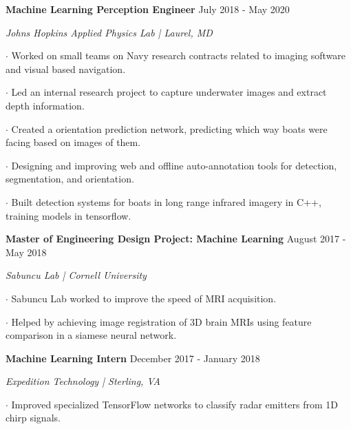 \documentclass[11pt]{article} %
\begin{document}
    \vspace{+4ex}
    \textbf{\large Machine Learning Perception Engineer} \hfill July 2018 - May 2020 \vspace{-0ex}
	\setlength{\parindent}{-0ex} \par
		\textit{Johns Hopkins Applied Physics Lab | Laurel, MD} \vspace{+3ex} \par
		$\boldsymbol{\cdot}$ Worked on small teams on Navy research contracts related to imaging software and visual based navigation. \par \vspace{+1ex}
		$\boldsymbol{\cdot}$ Led an internal research project to capture underwater images and extract depth information. \par \vspace{+1ex}
		$\boldsymbol{\cdot}$ Created a orientation prediction network, predicting which way boats were facing based on images of them. \par \vspace{+1ex}
		$\boldsymbol{\cdot}$ Designing and improving web and offline auto-annotation tools for detection, segmentation, and orientation.\par \vspace{+1ex}
		$\boldsymbol{\cdot}$ Built detection systems for boats in long range infrared imagery in C++, training models in tensorflow. \par \vspace{+1ex}
    \vspace{+3ex}
    \textbf{\large Master of Engineering Design Project: Machine Learning} \hfill August 2017 - May 2018 \vspace{-0ex}
	\setlength{\parindent}{-0ex} \par
		\textit{Sabuncu Lab | Cornell University}\vspace{+3ex} \par
		$\boldsymbol{\cdot}$ Sabuncu Lab worked to improve the speed of MRI acquisition. \par \vspace{+1ex}
		$\boldsymbol{\cdot}$ Helped by achieving image registration of 3D brain MRIs using feature comparison in a siamese neural network. \par \vspace{+3ex}
	\setlength{\itemindent}{0in}
	\vspace{+1ex} 
    \textbf{\large Machine Learning Intern} \hfill December 2017 - January 2018 \vspace{-0ex}
	\setlength{\parindent}{-0ex} \par
		\textit{Expedition Technology | Sterling, VA} \vspace{+3ex} \par
		$\boldsymbol{\cdot}$ Improved specialized TensorFlow networks to classify radar emitters from 1D chirp signals. \par 
\end{document}
